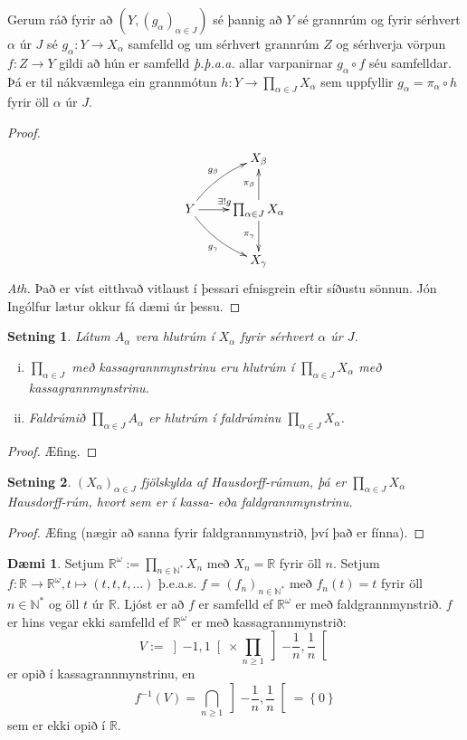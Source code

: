 \documentclass[a4paper,icelandic]{book}
\theoremstyle{definition}
\newtheorem{daemi}{Dæmi}[section]
\theoremstyle{plain}
\newtheorem{setn}{Setning}[section]
\theoremstyle{remark}
\newcommand{\R}{\mathbb{R}} %
\newcommand{\N}{\mathbb{N}} %
\begin{document}
Gerum ráð fyrir að $(Y,(g_\alpha)_{\alpha\in J})$ sé þannig að $Y$ sé grannrúm
og fyrir sérhvert $\alpha$ úr $J$ sé $g_\alpha:Y\to X_\alpha$ samfelld og um
sérhvert grannrúm $Z$ og sérhverja vörpun $f:Z\to Y$ gildi að hún er samfelld
\emph{þ.þ.a.a.} allar varpanirnar $g_{\alpha}\circ f$ séu samfelldar. Þá er til
nákvæmlega ein grannmótun $h:Y\to\prod_{\alpha\in J}X_\alpha$ sem uppfyllir
$g_\alpha = \pi_\alpha\circ h$ fyrir öll $\alpha$ úr $J$.
\begin{proof}
  \[
  \xymatrix{
     & X_\beta 
     \\
     Y \ar[r]^{\exists ! g}\ar@/^/[ur]^{g_\beta}\ar@/_/[dr]_{g_\gamma}
     & \prod_{\alpha\in J} X_\alpha \ar[u]^{\pi_\beta}\ar[d]_{\pi_\gamma} 
     \\
     & X_\gamma
  }
  \]
  \emph{Ath.} Það er víst eitthvað vitlaust í þessari efnisgrein eftir síðustu
  sönnun. Jón Ingólfur lætur okkur fá dæmi úr þessu.
\end{proof}
\begin{setn}
  Látum $A_\alpha$ vera hlutrúm í $X_\alpha$ fyrir sérhvert $\alpha$ úr
  $J$.
  \begin{enumerate}[(i)]
    \item $\prod_{\alpha\in J}$ með kassagrannmynstrinu eru hlutrúm í
      $\prod_{\alpha\in J} X_\alpha$ með kassagrannmynstrinu.
    \item Faldrúmið $\prod_{\alpha\in J} A_\alpha$ er hlutrúm í faldrúminu
      $\prod_{\alpha\in J}X_\alpha$. 
  \end{enumerate}
\end{setn}
\begin{proof}
  Æfing.
\end{proof}
\begin{setn}
  $(X_\alpha)_{\alpha\in J}$ fjölskylda af Hausdorff-rúmum, þá er
  $\prod_{\alpha\in J}X_\alpha$ Hausdorff-rúm, hvort sem er í kassa- eða
  faldgrannmynstrinu.
\end{setn}
\begin{proof}
  Æfing (nægir að sanna fyrir faldgrannmynstrið, því það er fínna).
\end{proof}
\begin{daemi}
  Setjum $\R^\omega := \prod_{n\in\N^*} X_n$  með $X_n = \R$ fyrir öll $n$. Setjum
  $f: \R\to\R^{\omega}, t\mapsto (t,t,t,\dots)$ þ.e.a.s. $f = (f_n)_{n\in\N^*}$
  með $f_n(t) = t$ fyrir öll $n\in\N^*$ og öll $t$ úr $\R$. Ljóst er að $f$ er
  samfelld ef $\R^\omega$ er með faldgrannmynstrið. $f$ er hins vegar ekki
  samfelld ef $\R^\omega$ er með kassagrannmynstrið:
  \[
  V := \left] -1,1 \right[\times\prod_{n\geq 1}\left] -\frac 1n,\frac 1n \right[
  \]
  er opið í kassagrannmynstrinu, en 
  \[
  f^{-1}(V) 
  = \bigcap_{n\geq 1} \left] -\frac 1n,\frac 1n \right[ 
  = \left\{ 0 \right\}
  \]
  sem er ekki opið í $\R$.
\end{daemi}
\end{document}
